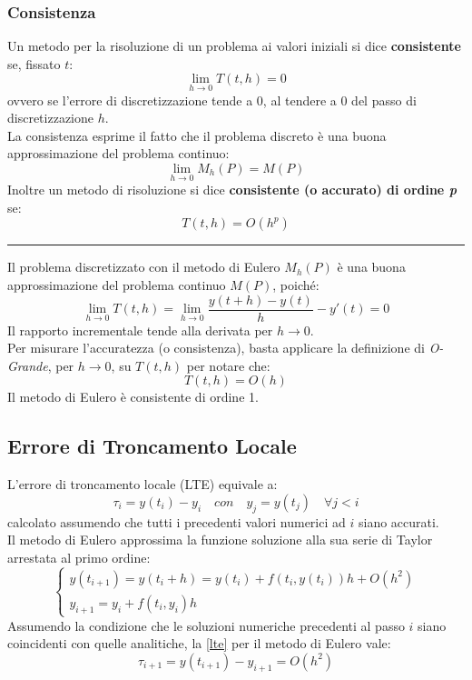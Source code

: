 \subsubsection{Consistenza}
Un metodo per la risoluzione di un problema ai valori iniziali si dice \textbf{consistente} se, fissato $t$:
\begin{equation*}
	\lim_{h \rightarrow 0} T(t,h) = 0
\end{equation*}
ovvero se l'errore di discretizzazione tende a 0, al tendere a 0 del passo di discretizzazione $h$.
\\La consistenza esprime il fatto che il problema discreto è una buona approssimazione del problema continuo:
\begin{equation*}
	\lim_{h \rightarrow 0} M_h(P) = M(P)
\end{equation*}
Inoltre un metodo di risoluzione si dice \textbf{consistente (o accurato) di ordine \textit{p}} se:
\begin{equation}
	T(t,h) = O(h^p)
\end{equation}
\hrule
\vspace{0.5cm}
Il problema discretizzato con il metodo di Eulero $M_h(P)$ è una buona approssimazione del problema continuo $M(P)$, poiché:
\begin{equation*}
	\lim_{h \rightarrow 0} T(t,h) = \lim_{h \rightarrow 0} \dfrac{y(t+h)-y(t)}{h} - y'(t) = 0
\end{equation*} 
Il rapporto incrementale tende alla derivata per $h \rightarrow 0$.
\\Per misurare l'accuratezza (o consistenza), basta applicare la definizione di \textit{O-Grande}, per $h \rightarrow 0$, su $T(t,h)$ per notare che:
\begin{equation*}
	T(t,h) = O(h)
\end{equation*} 
Il metodo di Eulero è consistente di ordine 1.

\subsection{Errore di Troncamento Locale}
L'errore di troncamento locale (LTE) equivale a:
\begin{equation}
	\label{lte}
	\tau_i = y(t_i) - y_i \quad con \quad y_j = y(t_j) \quad\forall j <i 
\end{equation}
calcolato assumendo che tutti i precedenti valori numerici ad $i$ siano accurati.
\\Il metodo di Eulero approssima la funzione soluzione alla sua serie di Taylor arrestata al primo ordine:
\begin{equation*}
	\begin{cases}
		y(t_{i+1}) = y(t_i+h) = y(t_i) + f(t_i, y(t_i))h + O(h^2) \\
		y_{i+1} = y_i + f(t_i, y_i)h
	\end{cases}
\end{equation*}
Assumendo la condizione che le soluzioni numeriche precedenti al passo $i$ siano coincidenti con quelle analitiche, la \ref{lte} per il metodo di Eulero vale:
\begin{equation}
	\tau_{i+1} = y(t_{i+1}) - y_{i+1} = O(h^2)
\end{equation}

